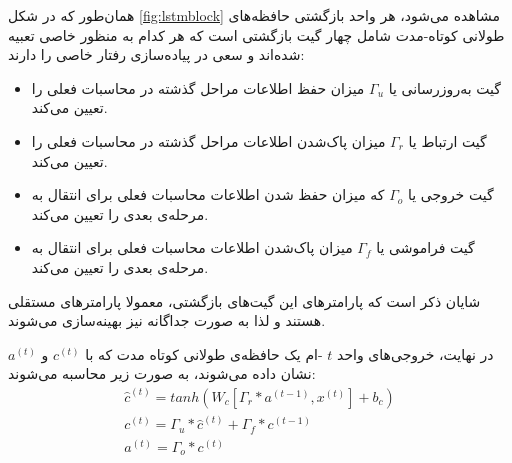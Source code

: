 همان‌طور که در شکل
\ref{fig:lstmblock}
مشاهده می‌شود، هر واحد بازگشتی حافظه‌های طولانی کوتاه-مدت شامل چهار گیت بازگشتی است که هر کدام به منظور خاصی تعبیه شده‌اند و سعی در پیاده‌سازی رفتار خاصی را دارند:

\begin{itemize}
    \item
    گیت به‌روزرسانی
    یا 
    $\Gamma_u$
    میزان حفظ اطلاعات مراحل گذشته در محاسبات فعلی را تعیین می‌کند.
    
    \item
    گیت ارتباط
    یا 
    $\Gamma_r$
    میزان پاک‌شدن اطلاعات مراحل گذشته در محاسبات فعلی را تعیین می‌کند.
    
    \item
    گیت خروجی
    یا 
    $\Gamma_o$
    که میزان حفظ شدن اطلاعات محاسبات فعلی برای انتقال به مرحله‌ی بعدی را تعیین می‌کند.
    
    \item
    گیت فراموشی
    یا
    $\Gamma_f$
    میزان پاک‌شدن اطلاعات محاسبات فعلی برای انتقال به مرحله‌ی بعدی را تعیین می‌کند.
\end{itemize}

شایان ذکر است که پارامترهای این گیت‌های بازگشتی، معمولا پارامترهای مستقلی هستند و لذا به صورت جداگانه نیز بهینه‌سازی می‌شوند.

در نهایت، خروجی‌های واحد
$t$
-ام یک
حافظه‌ی طولانی کوتاه مدت که با
$c^{(t)}$
و
$a^{(t)}$
نشان داده می‌شوند،
به صورت زیر محاسبه می‌شوند:
\begin{equation}
\begin{gathered}
    \hat{c}^{(t)} = tanh(W_c[\Gamma_r * a^{(t-1)}, x^{(t)}] + b_c) \\
    c^{(t)} = \Gamma_u * \hat{c}^{(t)} + \Gamma_f * c^{(t-1)} \\
    a^{(t)} = \Gamma_o * c^{(t)}
\end{gathered}
\end{equation}

\newpage

